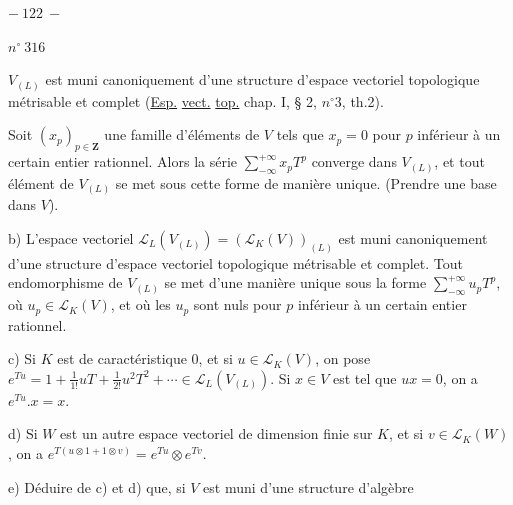 \begin{center}$-\ 122\ -$\end{center}
\begin{flushright}$n^{\circ}\ 316$\end{flushright}
$V_{(L)}$ est muni canoniquement d'une structure d'espace vectoriel topologique
métrisable et complet (\uline{Esp.} \uline{vect.} \uline{top.} chap. I, § 2, $n^{\circ}3$, th.2).

Soit $(x_p)_{p\in\mathbf Z}$ une famille d'éléments de $V$ tels que $x_p=0$
pour $p$ inférieur à un certain entier rationnel.
Alors la série $\sum_{-\infty}^{+\infty}x_pT^p$ converge dans $V_{(L)}$,
et tout élément de $V_{(L)}$ se met sous cette forme de manière unique.
(Prendre une base dans $V$).

b) L'espace vectoriel $\mathcal L_L(V_{(L)})=(\mathcal L_K(V))_{(L)}$
est muni canoniquement d'une structure d'espace vectoriel topologique métrisable et complet.
Tout endomorphisme de $V_{(L)}$ se met d'une manière unique sous la forme
$\sum_{-\infty}^{+\infty}u_pT^p$, où $u_p\in\mathcal L_K(V)$,
et où les $u_p$ sont nuls pour $p$ inférieur à un certain entier rationnel.

c) Si $K$ est de caractéristique 0, et si $u\in\mathcal L_K(V)$, on pose
$e^{Tu}=1+\frac{1}{1!}uT+\frac{1}{2!}u^2T^2+\cdots\in\mathcal L_L(V_{(L)})$.
Si $x\in V$ est tel que $ux=0$, on a $e^{Tu}.x=x$.

d) Si $W$ est un autre espace vectoriel de dimension finie sur $K$,
et si $v\in\mathcal L_K(W)$, on a
$e^{T(u\otimes1+1\otimes v)}=e^{Tu}\otimes e^{Tv}$.

e) Déduire de c) et d) que, si $V$ est muni d'une structure d'algèbre
